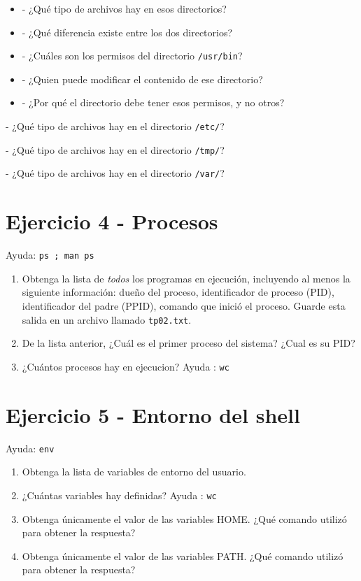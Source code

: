 \documentclass[12pt]{article}
\begin{document}
\begin{itemize}
\item - ¿Qué tipo de archivos hay en esos directorios?
\item - ¿Qué diferencia existe entre los dos directorios?
\item - ¿Cuáles son los permisos del directorio \texttt{/usr/bin}?
\item - ¿Quien puede modificar el contenido de ese directorio?
\item - ¿Por qué el directorio debe tener esos permisos, y no otros?
\end{itemize}

\item - ¿Qué tipo de archivos hay en el directorio \texttt{/etc/}?

\item - ¿Qué tipo de archivos hay en el directorio \texttt{/tmp/}?

\item - ¿Qué tipo de archivos hay en el directorio \texttt{/var/}?

\section*{Ejercicio 4 - Procesos}
Ayuda: \texttt{ps ; man ps}
\begin{enumerate}
\item Obtenga la lista de \textit{todos} los programas en ejecución, incluyendo al menos la siguiente información:
dueño del proceso, identificador de proceso (PID), identificador del padre (PPID),
comando que inició el proceso. Guarde esta salida en un archivo llamado \texttt{tp02.txt}.
\item De la lista anterior, ¿Cuál es el primer proceso del sistema? ¿Cual es su PID?
\item ¿Cuántos procesos hay en ejecucion? Ayuda : \texttt{wc}
\end{enumerate}

\section*{Ejercicio 5 - Entorno del shell}
Ayuda: \texttt{env}
\begin{enumerate}
\item Obtenga la lista de variables de entorno del usuario.
\item ¿Cuántas variables hay definidas? Ayuda : \texttt{wc}
\item Obtenga únicamente el valor de las variables HOME. ¿Qué comando utilizó para obtener la respuesta?
\item Obtenga únicamente el valor de las variables PATH. ¿Qué comando utilizó para obtener la respuesta?
\end{enumerate}
\end{document}
